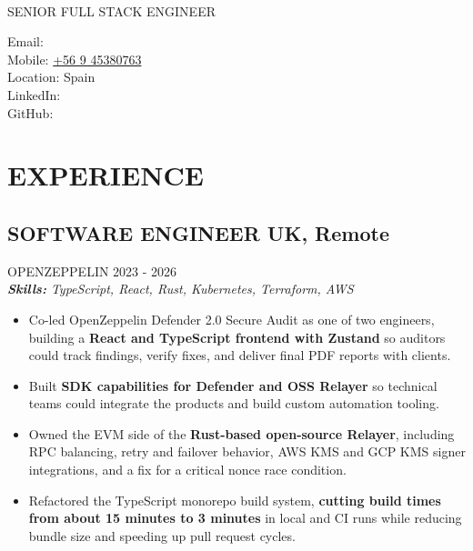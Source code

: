 \documentclass{article}
\newcommand{\WorkExperience}[2]{
   \subsection*{#1}
   \vspace{-1em}
   \uppercase{#2}
}
\newcommand{\Skills}[1]{
   \textit{\textbf{Skills:} #1}
}
\begin{document}
\begin{center}
	\begin{minipage}{0.5\textwidth}
		{\fontsize{24}{28}\Title{}} \\
		\bigskip
		{\normalsize \MakeUppercase{Senior Full Stack Engineer}}
	\end{minipage} \hfill
	\begin{minipage}{0.4\textwidth}
		\raggedleft{}
		Email: \href{mailto:\ResumeEmail}{\ResumeEmail} \\
		Mobile: \href{tel:+56945380763}{+56 9 45380763}  \\
		Location: Spain \\
		LinkedIn: \href{\ResumeLinkedInUrl}{\ResumeLinkedInLabel} \\
		GitHub: \href{\ResumeGitHubUrl}{\ResumeGitHubLabel}
	\end{minipage}
\end{center}

\vspace{-3em}

\phantom{Amazon, Microsoft, Facebook} %

\section*{EXPERIENCE}
\WorkExperience{SOFTWARE ENGINEER \hfill UK, Remote}{OpenZeppelin \hfill 2023 {-} 2026} \\
\Skills{TypeScript, React, Rust, Kubernetes, Terraform, AWS}
\begin{itemize}
	\item Co-led OpenZeppelin Defender 2.0 Secure Audit as one of two engineers, building a \textbf{React and TypeScript frontend with Zustand} so auditors could track findings, verify fixes, and deliver final PDF reports with clients.
	\item Built \textbf{SDK capabilities for Defender and OSS Relayer} so technical teams could integrate the products and build custom automation tooling.
	\item Owned the EVM side of the \textbf{Rust-based open-source Relayer}, including RPC balancing, retry and failover behavior, AWS KMS and GCP KMS signer integrations, and a fix for a critical nonce race condition.
	\item Refactored the TypeScript monorepo build system, \textbf{cutting build times from about 15 minutes to 3 minutes} in local and CI runs while reducing bundle size and speeding up pull request cycles.
\end{itemize}
\end{document}
